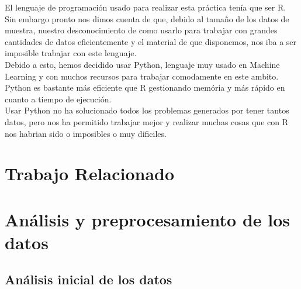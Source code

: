\documentclass[a4paper]{article}
\begin{document}
El lenguaje de programación usado para realizar esta práctica tenía que ser R. Sin embargo pronto nos dimos cuenta de que, debido al tamaño de los datos de muestra, nuestro desconocimiento de como usarlo para trabajar con grandes cantidades de datos eficientemente y el material de que disponemos, nos iba a ser imposible trabajar con este lenguaje.\\

Debido a esto, hemos decidido usar Python, lenguaje muy usado en Machine Learning y con muchos recursos para trabajar comodamente en este ambito. Python es bastante más eficiente que R gestionando memória y más rápido en cuanto a tiempo de ejecución.\\

Usar Python no ha solucionado todos los problemas generados por tener tantos datos, pero nos ha permitido trabajar mejor y realizar muchas cosas que con R nos habrian sido o imposibles o muy dificiles.


\section{Trabajo Relacionado}



\section{Análisis y preprocesamiento de los datos}

\subsection{Análisis inicial de los datos}
\end{document}
